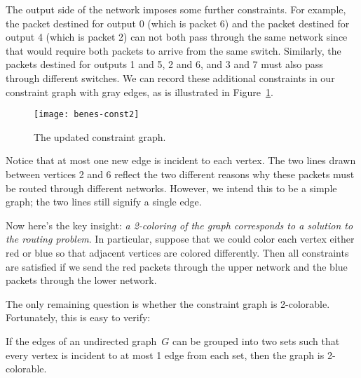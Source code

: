 The output side of the network imposes some further constraints.  For
example, the packet destined for output 0 (which is packet 6) and the
packet destined for output 4 (which is packet 2) can not both pass
through the same network since that would require both packets to
arrive from the same switch.  Similarly, the packets destined for
outputs 1 and 5, 2 and 6, and 3 and 7 must also pass through different
switches.  We can record these additional constraints in our
constraint graph with gray edges, as is illustrated in
Figure~\ref{fig:6EW}.

\begin{figure}


\texttt{[image: benes-const2]}

\caption{The updated constraint graph.}

\label{fig:6EW}

\end{figure}

Notice that at most one new edge is incident to each vertex.
The two lines drawn between vertices 2 and 6 reflect the two different
reasons why these packets must be routed through different networks.
However, we intend this to be a simple graph; the two lines still
signify a single edge.

Now here's the key insight: \emph{a 2-coloring of the graph
corresponds to a solution to the routing problem}.  In particular,
suppose that we could color each vertex either red or blue so that
adjacent vertices are colored differently.  Then all constraints are
satisfied if we send the red packets through the upper network and the
blue packets through the lower network.

The only remaining question is whether the constraint graph is
2-colorable.  Fortunately, this is easy to verify:

\begin{lemma}\label{deg1-union}
  If the edges of an undirected graph~$G$ can be grouped into two sets
  such that every vertex is incident to at most 1 edge from each set,
  then the graph is 2-colorable.
\end{lemma}

